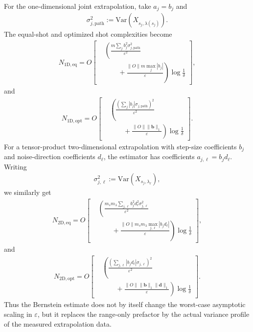 \documentclass[aps,pra,reprint,groupedaddress,floatfix]{revtex4-2}
\newcommand{\eps}{\varepsilon}
\begin{document}
For the one-dimensional joint extrapolation, take $a_j=b_j$ and
\begin{align*}
    \sigma_{j,\mathrm{path}}^2
    :=
    \mathrm{Var}\!\left(X_{s_j,\lambda(s_j)}\right).
\end{align*}
The equal-shot and optimized shot complexities become
\begin{align}
\label{eq:1d-equal-shot}
    N_{\mathrm{1D,eq}}
    =
    O\left[
    \begin{aligned}
    &\left(
    \frac{m\sum_j b_j^2\sigma_{j,\mathrm{path}}^2}{\eps^2}\right.\\
    &\left.\qquad+
    \frac{\|O\|m\max_j|b_j|}{\eps}
    \right)\log\frac{1}{\delta}
    \end{aligned}
    \right],
\end{align}
and
\begin{align}
\label{eq:1d-opt-shot}
    N_{\mathrm{1D,opt}}
    =
    O\left[
    \begin{aligned}
    &\left(
    \frac{\left(\sum_j |b_j|\sigma_{j,\mathrm{path}}\right)^2}{\eps^2}\right.\\
    &\left.\qquad+
    \frac{\|O\|\|\mathbf b\|_1}{\eps}
    \right)\log\frac{1}{\delta}
    \end{aligned}
    \right].
\end{align}
For a tensor-product two-dimensional extrapolation with step-size coefficients $b_j$ and noise-direction coefficients $d_\ell$, the estimator has coefficients $a_{j,\ell}=b_jd_\ell$. Writing
\begin{align*}
    \sigma_{j,\ell}^2
    :=
    \mathrm{Var}\!\left(X_{s_j,\lambda_\ell}\right),
\end{align*}
we similarly get
\begin{align}
\label{eq:2d-equal-shot}
    N_{\mathrm{2D,eq}}
    =
    O\left[
    \begin{aligned}
    &\left(
    \frac{m_sm_\lambda\sum_{j,\ell} b_j^2d_\ell^2\sigma_{j,\ell}^2}{\eps^2}
    \right.\\
    &\left.\qquad+
    \frac{\|O\|m_sm_\lambda\max_{j,\ell}|b_jd_\ell|}{\eps}
    \right)\log\frac{1}{\delta}
    \end{aligned}
    \right],
\end{align}
and
\begin{align}
\label{eq:2d-opt-shot}
    N_{\mathrm{2D,opt}}
    =
    O\left[
    \begin{aligned}
    &\left(
    \frac{\left(\sum_{j,\ell}|b_jd_\ell|\sigma_{j,\ell}\right)^2}{\eps^2}
    \right.\\
    &\left.\qquad+
    \frac{\|O\|\|\mathbf b\|_1\|\mathbf d\|_1}{\eps}
    \right)\log\frac{1}{\delta}
    \end{aligned}
    \right].
\end{align}
Thus the Bernstein estimate does not by itself change the worst-case asymptotic scaling in $\eps$, but it replaces the range-only prefactor by the actual variance profile of the measured extrapolation data.
\end{document}
